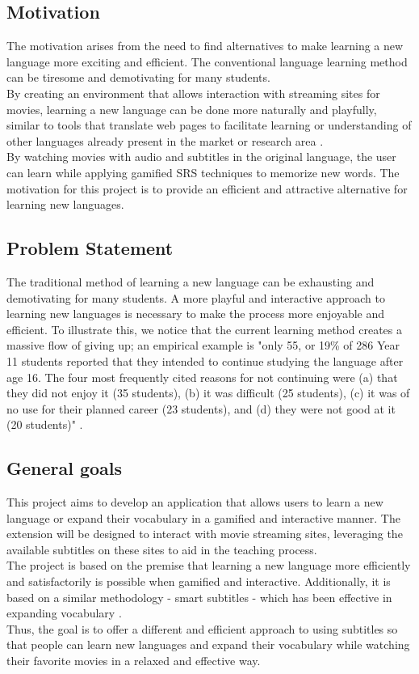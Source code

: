\documentclass[12pt]{article}
\begin{document}
\subsection{Motivation}
The motivation arises from the need to find alternatives to make learning a new language more exciting and efficient. The conventional language learning method can be tiresome and demotivating for many students. \\
By creating an environment that allows interaction with streaming sites for movies, learning a new language can be done more naturally and playfully, similar to tools that translate web pages to facilitate learning or understanding of other languages already present in the market or research area \cite{ElBatanony21}. \\
By watching movies with audio and subtitles in the original language, the user can learn while applying gamified SRS techniques to memorize new words. The motivation for this project is to provide an efficient and attractive alternative for learning new languages.

\subsection{Problem Statement}
The traditional method of learning a new language can be exhausting and demotivating for many students. A more playful and interactive approach to learning new languages is necessary to make the process more enjoyable and efficient. 
To illustrate this, we notice that the current learning method creates a massive flow of giving up; an empirical example is "only 55, or 19\% of 286 Year 11 students reported that they intended to continue studying the language after age 16. The four most frequently cited reasons for not continuing were (a) that they did not enjoy it (35 students), (b) it was difficult (25 students), (c) it was of no use for their planned career (23 students), and (d) they were not good at it (20 students)" \cite{Graham1}. 

\subsection{General goals}

This project aims to develop an application that allows users to learn a new language or expand their vocabulary in a gamified and interactive manner. The extension will be designed to interact with movie streaming sites, leveraging the available subtitles on these sites to aid in the teaching process. \\
The project is based on the premise that learning a new language more efficiently and satisfactorily is possible when gamified and interactive. Additionally, it is based on a similar methodology - smart subtitles - which has been effective in expanding vocabulary \cite{Kovacs14}. \\
Thus, the goal is to offer a different and efficient approach to using subtitles so that people can learn new languages and expand their vocabulary while watching their favorite movies in a relaxed and effective way.
\end{document}
